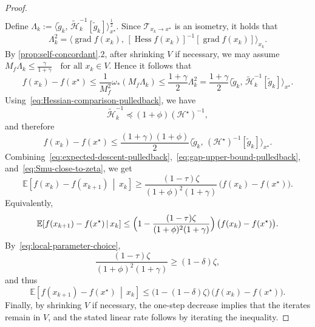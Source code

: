 \documentclass[10pt,a4paper]{amsart}
\newcommand{\Hess}{\operatorname{Hess}}
\DeclareMathOperator{\grad}{grad}
\begin{document}
\begin{proof}
\begin{align}
\end{align}
Define
$
\Lambda_k
:=
\big\langle
\widetilde g_k,\,
\widetilde{\mathcal H}_k^{-1}[\widetilde g_k]
\big\rangle_{x^\star}^{\frac{1}{2}}.
$
Since $\mathcal T_{x_k\to x^\star}$ is an isometry, it holds that
\[
\Lambda_k^2
=
\big\langle
\grad f(x_k),\,
[\Hess f(x_k)]^{-1}[\grad f(x_k)]
\big\rangle_{x_k}.
\]
By \cref{prop:self-concordant}.2, after shrinking $V$ if necessary, we may assume
$
M_f\Lambda_k\le \frac{\gamma}{1+\gamma}\quad \text{for all } x_k\in V.
$
Hence it follows that
\[
f(x_k)-f(x^\star)
\le
\frac{1}{M_f^2}\omega_*(M_f\Lambda_k)
\le
\frac{1+\gamma}{2}\Lambda_k^2
=
\frac{1+\gamma}{2}
\big\langle
\widetilde g_k,\,
\widetilde{\mathcal H}_k^{-1}[\widetilde g_k]
\big\rangle_{x^\star}.
\]
Using~\eqref{eq:Hessian-comparison-pulledback}, we have
\[
\widetilde{\mathcal H}_k^{-1}\preceq (1+\phi)(\mathcal{H}^\star)^{-1},
\]
and therefore
\begin{equation}
f(x_k)-f(x^\star)
\le
\frac{(1+\gamma)(1+\phi)}{2}
\big\langle
\widetilde g_k,\,
(\mathcal{H}^\star)^{-1}[\widetilde g_k]
\big\rangle_{x^\star}.
\label{eq:gap-upper-bound-pulledback}
\end{equation}
Combining~\eqref{eq:expected-descent-pulledback},~\eqref{eq:gap-upper-bound-pulledback}, and~\eqref{eq:Smu-close-to-zeta}, we get
\[
\mathbb E\!\left[f(x_k)-f(x_{k+1})\,\middle|\,x_k\right]
\ge
\frac{(1-\tau)\zeta}{(1+\phi)^2(1+\gamma)}\,\bigl(f(x_k)-f(x^\star)\bigr).
\]
Equivalently,
\[
\mathbb E\!\left[f(x_{k+1})-f(x^\star)\,\middle|\,x_k\right]
\le
\Bigl(1-\frac{(1-\tau)\zeta}{(1+\phi)^2(1+\gamma)}\Bigr)\,\bigl(f(x_k)-f(x^\star)\bigr).
\]
By~\eqref{eq:local-parameter-choice},
\[
\frac{(1-\tau)\zeta}{(1+\phi)^2(1+\gamma)}\ge (1-\delta)\zeta,
\]
and thus
\[
\mathbb E\!\left[f(x_{k+1})-f(x^\star)\,\middle|\,x_k\right]
\le
\bigl(1-(1-\delta)\zeta\bigr)\,\bigl(f(x_k)-f(x^\star)\bigr).
\]
Finally, by shrinking $V$ if necessary, the one-step decrease implies that the iterates remain in $V$, and the stated linear rate follows by iterating the inequality.
\end{proof}
\end{document}
